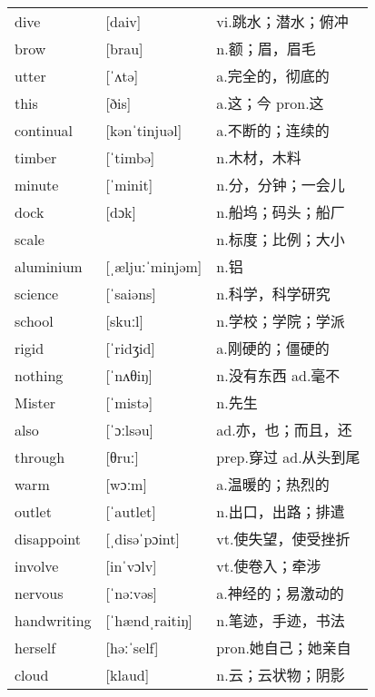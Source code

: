 \documentclass[a4paper]{article}
\begin{document}
\section{}
\begin{tabular}{l l l}

dive & [daiv] & vi.跳水；潜水；俯冲 \\
brow & [brau] & n.额；眉，眉毛 \\
utter & [ˈʌtə] & a.完全的，彻底的 \\
this & [ðis] & a.这；今 pron.这 \\
continual & [kənˈtinjuəl] & a.不断的；连续的 \\
timber & [ˈtimbə] & n.木材，木料 \\
minute & [ˈminit] & n.分，分钟；一会儿 \\
dock & [dɔk] & n.船坞；码头；船厂 \\
scale &  & n.标度；比例；大小 \\
aluminium & [ˌæljuːˈminjəm] & n.铝 \\
science & [ˈsaiəns] & n.科学，科学研究 \\
school & [skuːl] & n.学校；学院；学派 \\
rigid & [ˈridʒid] & a.刚硬的；僵硬的 \\
nothing & [ˈnʌθiŋ] & n.没有东西 ad.毫不 \\
Mister & [ˈmistə] & n.先生 \\
also & [ˈɔːlsəu] & ad.亦，也；而且，还 \\
through & [θruː] & prep.穿过 ad.从头到尾 \\
warm & [wɔːm] & a.温暖的；热烈的 \\
outlet & [ˈautlet] & n.出口，出路；排遣 \\
disappoint & [ˌdisəˈpɔint] & vt.使失望，使受挫折 \\
involve & [inˈvɔlv] & vt.使卷入；牵涉 \\
nervous & [ˈnəːvəs] & a.神经的；易激动的 \\
handwriting & [ˈhændˌraitiŋ] & n.笔迹，手迹，书法 \\
herself & [həːˈself] & pron.她自己；她亲自 \\
cloud & [klaud] & n.云；云状物；阴影 \\

\end{tabular}
\end{document}
